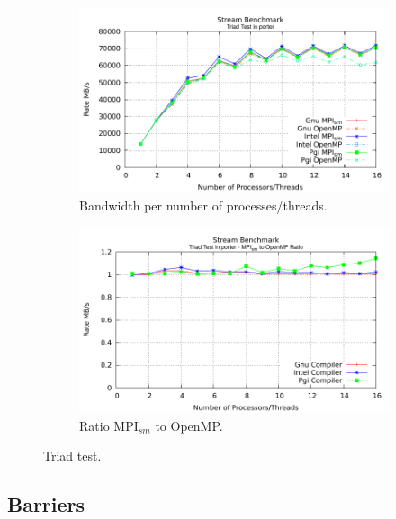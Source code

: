 \begin{figure} [h!]
    \centering
    \captionsetup{justification=centering, singlelinecheck=false}
    \begin{subfigure}{.6\textwidth}
      \centering
      \hspace*{-1.5cm} 
      \includegraphics[width=0.95\linewidth]{Plots/streamBenchmark/porter-Triad.pdf}
      \caption[]{Bandwidth per number of processes/threads.}
      \label{fig:Triad}
    \end{subfigure}%
    \begin{subfigure}{.6\textwidth}
      \centering
      \hspace*{-1.5cm} 
      \includegraphics[width=0.95\linewidth]{Plots/streamBenchmark/porter-TriadRatio.pdf}
      \caption{Ratio MPI$_{sm}$ to OpenMP.}
      \label{fig:TriadRatio}
    \end{subfigure}
\caption{Triad test.}
\label{fig:TriadTest}
\end{figure}

\newpage

\subsection*{Barriers}

